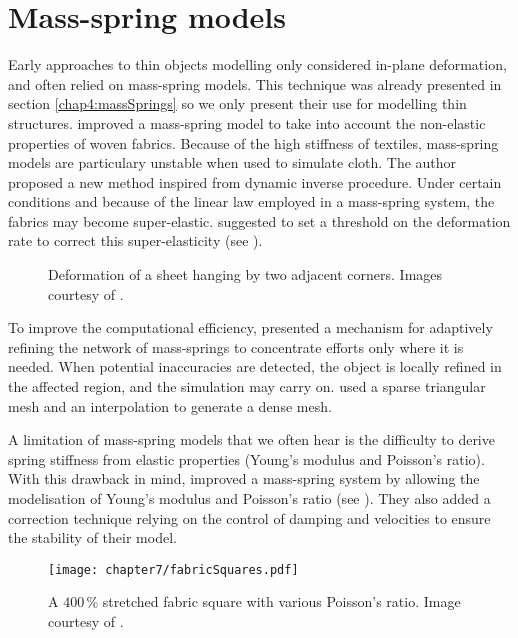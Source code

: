 \section{Mass-spring models}

Early approaches to thin objects modelling only considered in-plane deformation, and often relied on mass-spring models. This technique was already presented in section \ref{chap4:massSprings} so we only present their use for modelling thin structures. \cite{Provot95} improved a mass-spring model to take into account the non-elastic properties of woven fabrics. Because of the high stiffness of textiles, mass-spring models are particulary unstable when used to simulate cloth. The author proposed a new method inspired from dynamic inverse procedure. Under certain conditions and because of the linear law employed in a mass-spring system, the fabrics may become super-elastic. \citeauthor{Provot95} suggested to set a threshold on the deformation rate to correct this super-elasticity (see ). 
%
\begin{figure}[ht]
\centering 
{}
\hfill 
{}
\hfill 
{}
\caption{Deformation of a sheet hanging by two adjacent corners. Images courtesy of \cite{Provot95}.}
\label{chap7:fig-sheet}
\end{figure}

To improve the computational efficiency, \cite{Hutchinson96} presented a mechanism for adaptively refining the network of mass-springs to concentrate efforts only where it is needed. When potential inaccuracies are detected, the object is locally refined in the affected region, and the simulation may carry on. \cite{Oshita01} used a sparse triangular mesh and an interpolation to generate a dense mesh. 

A limitation of mass-spring models that we often hear is the difficulty to derive spring stiffness from elastic properties (Young's modulus and Poisson's ratio). With this drawback in mind, \cite{Volino97} improved a mass-spring system by allowing the modelisation of Young's modulus and Poisson's ratio (see ). They also added a correction technique relying on the control of damping and velocities to ensure the stability of their model. 
%
\begin{figure}[ht]
\begin{center}
\texttt{[image: chapter7/fabricSquares.pdf]}
\caption[A $400\,$\% stretched fabric square]{A $400\,$\% stretched fabric square with various Poisson's ratio. Image courtesy of \cite{Volino97}.}
\label{chap7:fig-fabricSquares}
\end{center}
\end{figure}

